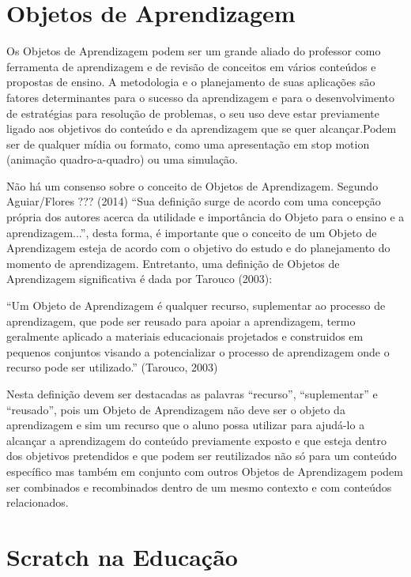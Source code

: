 \documentclass[12pt, openright, a4paper, brazil, openany, oneside]{abntex2}
\begin{document}
\chapter{Objetos de Aprendizagem}

Os Objetos de Aprendizagem podem ser um grande aliado do professor como ferramenta de aprendizagem e de revisão de conceitos em vários conteúdos e propostas de ensino. A metodologia e o planejamento de suas aplicações são fatores determinantes para o sucesso da aprendizagem e para o desenvolvimento de estratégias para resolução de problemas, o seu uso deve estar previamente ligado aos objetivos do conteúdo e da aprendizagem que se quer alcançar.Podem ser de qualquer mídia ou formato, como uma apresentação em stop motion (animação quadro-a-quadro) ou uma simulação.

Não há um consenso sobre o conceito de Objetos de Aprendizagem. Segundo Aguiar/Flores ??? (2014) ``Sua definição surge de acordo com uma concepção própria dos autores acerca da utilidade e importância do Objeto para o ensino e a aprendizagem...'', desta forma, é importante que o conceito de um Objeto de Aprendizagem esteja de acordo com o objetivo do estudo e do planejamento do momento de aprendizagem. Entretanto, uma definição de Objetos de Aprendizagem significativa é dada por Tarouco (2003):


\begin{citacao}

``Um Objeto de Aprendizagem é qualquer recurso, suplementar ao processo de aprendizagem, que pode ser reusado para apoiar a aprendizagem, termo geralmente aplicado a materiais educacionais projetados e construidos em pequenos conjuntos visando a potencializar o processo de aprendizagem onde o recurso pode ser utilizado.''\cite{tarouco} (Tarouco, 2003)

\end{citacao}

Nesta definição devem ser destacadas as palavras ``recurso'', ``suplementar'' e ``reusado'', pois um Objeto de Aprendizagem não deve ser o objeto da aprendizagem e sim um recurso que o aluno possa utilizar para ajudá-lo a alcançar a aprendizagem do conteúdo previamente exposto e que esteja dentro dos objetivos pretendidos e que podem ser reutilizados não só para um conteúdo específico mas também em conjunto com outros Objetos de Aprendizagem podem ser combinados e recombinados dentro de um mesmo contexto e com conteúdos relacionados.

\chapter{Scratch na Educação}
\end{document}
